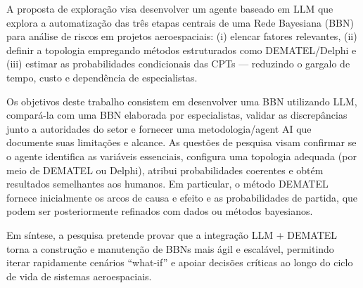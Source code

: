 A proposta de exploração visa desenvolver um agente baseado em LLM que explora a automatização das três etapas centrais de uma Rede Bayesiana (BBN) para análise de riscos em projetos aeroespaciais: (i) elencar fatores relevantes, (ii) definir a topologia empregando métodos estruturados como DEMATEL/Delphi e (iii) estimar as probabilidades condicionais das CPTs — reduzindo o gargalo de tempo, custo e dependência de especialistas.

Os objetivos deste trabalho consistem em desenvolver uma BBN utilizando LLM, compará-la com uma BBN elaborada por especialistas, validar as discrepâncias junto a autoridades do setor e fornecer uma metodologia/agent AI que documente suas limitações e alcance. As questões de pesquisa visam confirmar se o agente identifica as variáveis essenciais, configura uma topologia adequada (por meio de DEMATEL ou Delphi), atribui probabilidades coerentes e obtém resultados semelhantes aos humanos. Em particular, o método DEMATEL fornece inicialmente os arcos de causa e efeito e as probabilidades de partida, que podem ser posteriormente refinados com dados ou métodos bayesianos.

Em síntese, a pesquisa pretende provar que a integração LLM + DEMATEL torna a construção e manutenção de BBNs mais ágil e escalável, permitindo iterar rapidamente cenários “what-if” e apoiar decisões críticas ao longo do ciclo de vida de sistemas aeroespaciais.